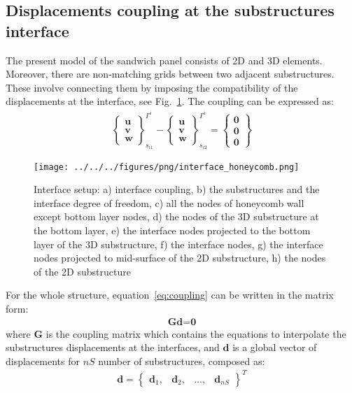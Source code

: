 \documentclass[a4paper,12pt]{article}
\begin{document}
\subsection{Displacements coupling at the substructures interface}
\label{sec:interface}
The present model of the sandwich panel consists of 2D and 3D elements. 
Moreover, there are non-matching grids between two adjacent substructures. 
These involve connecting them by imposing the compatibility of the 
displacements at the interface, see Fig.~\ref{fig:interface}. The coupling can 
be expressed as:
\begin{eqnarray}
\left\{\begin{array}{c}
	\textbf{u}\\
	\textbf{v}\\
	\textbf{w}
	\end{array}\right\}_{s_{i1}}^{\Gamma^i}-
	\left\{\begin{array}{c}
	\textbf{u}\\
	\textbf{v}\\
	\textbf{w}
	\end{array}\right\}_{s_{i2}}^{\Gamma^i}=
	\left\{\begin{array}{c}
	\textbf{0}\\
	\textbf{0}\\
	\textbf{0}
	\end{array}\right\}
\label{eq:coupling}
\end{eqnarray}
\begin{figure}
	\begin{center}
		\texttt{[image: ../../../figures/png/interface\_honeycomb.png]}
	\end{center}
	\caption{Interface setup: a) interface coupling, b) the substructures and 
	the interface degree of freedom, c) all the nodes of honeycomb wall except 
	bottom layer nodes, d) the nodes of the 3D substructure at the bottom 
	layer, e) the interface nodes projected to the bottom layer of the 3D 
	substructure, f) the interface nodes, g) the interface nodes projected to 
	mid-surface of the 2D substructure, h) the nodes of the 2D substructure}
	\label{fig:interface}
\end{figure}
For the whole structure, equation~\ref{eq:coupling} can be written in the 
matrix form:
\begin{eqnarray}
\textbf{G}\textbf{d}=\textbf{0}
\label{eq:cond_disp}
\end{eqnarray}
where \textbf{G} is the coupling matrix which contains the equations to interpolate the substructures displacements at the interfaces, and $\textbf{d}$ is a global vector of displacements for $nS$ number of substructures, composed as:
\begin{eqnarray}
\textbf{d} = \left\{\begin{array}{cccc}
\textbf{d}_1, & \textbf{d}_2, &\ldots, & \textbf{d}_{nS}
\end{array}\right\}^T
\label{eq:displacements}
\end{eqnarray}
\end{document}
